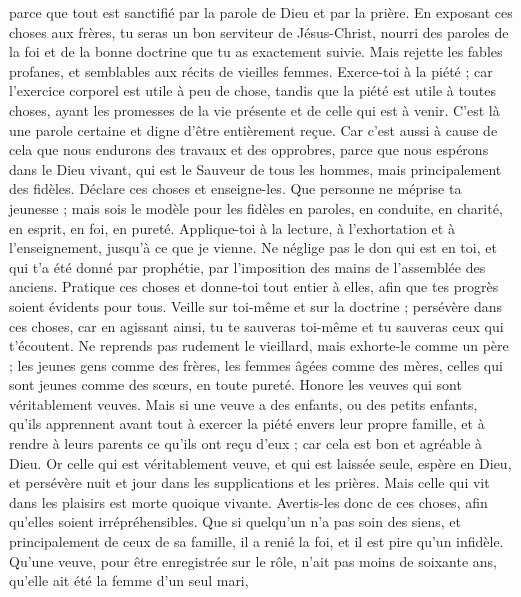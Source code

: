 \begin{multicols}{2}
parce que tout est sanctifié par la parole de Dieu et par la prière.
En exposant ces choses aux frères, tu seras un bon serviteur de Jésus-Christ, nourri des paroles de la foi et de la bonne doctrine que tu as exactement suivie.
Mais rejette les fables profanes, et semblables aux récits de vieilles femmes.
Exerce-toi à la piété ; car l'exercice corporel est utile à peu de chose, tandis que la piété est utile à toutes choses, ayant les promesses de la vie présente et de celle qui est à venir.
C'est là une parole certaine et digne d'être entièrement reçue.
Car c'est aussi à cause de cela que nous endurons des travaux et des opprobres, parce que nous espérons dans le Dieu vivant, qui est le Sauveur de tous les hommes, mais principalement des fidèles.
Déclare ces choses et enseigne-les.
Que personne ne méprise ta jeunesse ; mais sois le modèle pour les fidèles en paroles, en conduite, en charité, en esprit, en foi, en pureté.
Applique-toi à la lecture, à l'exhortation et à l'enseignement, jusqu'à ce que je vienne.
Ne néglige pas le don qui est en toi, et qui t'a été donné par prophétie, par l'imposition des mains de l'assemblée des anciens.
Pratique ces choses et donne-toi tout entier à elles, afin que tes progrès soient évidents pour tous.
Veille sur toi-même et sur la doctrine ; persévère dans ces choses, car en agissant ainsi, tu te sauveras toi-même et tu sauveras ceux qui t'écoutent.
\VerseOne{}Ne reprends pas rudement le vieillard, mais exhorte-le comme un père ; les jeunes gens comme des frères,
les femmes âgées comme des mères, celles qui sont jeunes comme des sœurs, en toute pureté.
Honore les veuves qui sont véritablement veuves.
Mais si une veuve a des enfants, ou des petits enfants, qu'ils apprennent avant tout à exercer la piété envers leur propre famille, et à rendre à leurs parents ce qu'ils ont reçu d'eux ; car cela est bon et agréable à Dieu.
Or celle qui est véritablement veuve, et qui est laissée seule, espère en Dieu, et persévère nuit et jour dans les supplications et les prières.
Mais celle qui vit dans les plaisirs est morte quoique vivante.
Avertis-les donc de ces choses, afin qu'elles soient irrépréhensibles.
Que si quelqu'un n'a pas soin des siens, et principalement de ceux de sa famille, il a renié la foi, et il est pire qu'un infidèle.
Qu'une veuve, pour être enregistrée sur le rôle, n'ait pas moins de soixante ans, qu'elle ait été la femme d'un seul mari,

\end{multicols}
